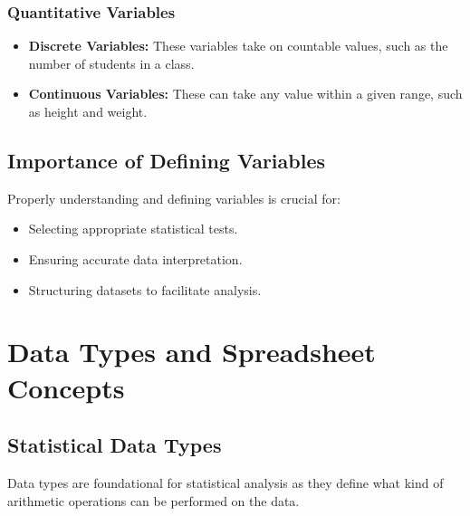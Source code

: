 \documentclass[
  letterpaper,
  DIV=11,
  numbers=noendperiod]{scrreprt}
\providecommand{\tightlist}{%
  \setlength{\itemsep}{0pt}\setlength{\parskip}{0pt}}
\begin{document}
\subsection{Quantitative Variables}\label{quantitative-variables}

\begin{itemize}
\tightlist
\item
  \textbf{Discrete Variables:} These variables take on countable values,
  such as the number of students in a class.
\item
  \textbf{Continuous Variables:} These can take any value within a given
  range, such as height and weight.
\end{itemize}

\section{Importance of Defining
Variables}\label{importance-of-defining-variables}

Properly understanding and defining variables is crucial for:

\begin{itemize}
\tightlist
\item
  Selecting appropriate statistical tests.
\item
  Ensuring accurate data interpretation.
\item
  Structuring datasets to facilitate analysis.
\end{itemize}


\chapter{Data Types and Spreadsheet
Concepts}\label{data-types-and-spreadsheet-concepts}

\section{Statistical Data Types}\label{statistical-data-types}

Data types are foundational for statistical analysis as they define what
kind of arithmetic operations can be performed on the data.
\end{document}
